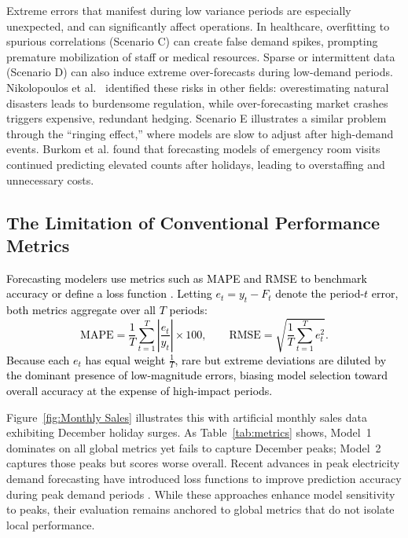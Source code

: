 \documentclass[]{interact}
\newcommand{\matt}[1]{\textcolor{black}{#1}}
\theoremstyle{plain}
\theoremstyle{definition}
\theoremstyle{remark}
\begin{document}
Extreme errors that manifest during low variance periods are especially unexpected, and can significantly affect operations. In healthcare, overfitting to spurious correlations (Scenario C) can create false demand spikes, prompting premature mobilization of staff or medical resources. Sparse or intermittent data (Scenario D) can also induce extreme over-forecasts during low-demand periods. Nikolopoulos et al.~\cite{nikolopoulos2021} identified these risks in other fields: overestimating natural disasters leads to burdensome regulation, while over-forecasting market crashes triggers expensive, redundant hedging. Scenario E illustrates a similar problem through the ``ringing effect,'' where models are slow to adjust after high-demand events. Burkom et al.\cite{Burkom2007} found that forecasting models of emergency room visits continued predicting elevated counts after holidays, leading to overstaffing and unnecessary costs.

\subsection{The Limitation of Conventional Performance Metrics}
\matt{Forecasting modelers use metrics such as MAPE and RMSE to benchmark accuracy or define a loss function \citep{petropoulos2022}. Letting $e_t = y_t - F_t$ denote the period-$t$ error, both metrics aggregate over all $T$ periods:
\begin{equation}
\text{MAPE} = \frac{1}{T} \sum_{t=1}^{T} \left| \frac{e_t}{y_t} \right| \times 100,
\qquad
\text{RMSE} = \sqrt{\frac{1}{T} \sum_{t=1}^{T} e_t^2}.
\end{equation}
Because each $e_t$ has equal weight $\frac{1}{T}$, rare but extreme deviations are diluted by the dominant presence of low-magnitude errors, biasing model selection toward overall accuracy at the expense of high-impact periods.}

Figure~\ref{fig:Monthly Sales} illustrates this with artificial monthly sales data exhibiting December holiday surges. As Table~\ref{tab:metrics} shows, Model~1 dominates on all global metrics yet fails to capture December peaks; Model~2 captures those peaks but scores worse overall. Recent advances in peak electricity demand forecasting have introduced loss functions to improve prediction accuracy during peak demand periods \citep{nygard2025}. While these approaches enhance model sensitivity to peaks, their evaluation remains anchored to global metrics that do not isolate local performance.
\end{document}
